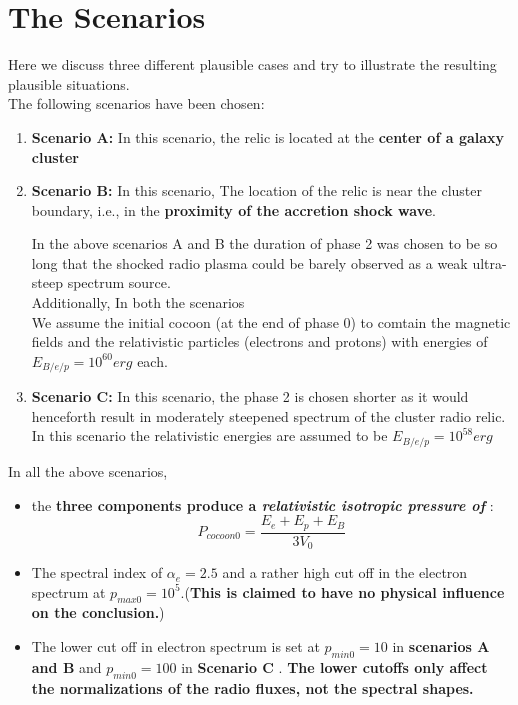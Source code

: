 \documentclass[11pt]{report}
\newcommand{\tbf}[1]{\textbf{#1}}
\newcommand{\tit}[1]{\textit{#1}}
\newcommand{\cbox}{tcolorbox}
\begin{document}
\section{The Scenarios}
Here we discuss three different plausible cases and try to illustrate the resulting plausible situations.\\
The following scenarios have been chosen:
\begin{enumerate}
\item \tbf{Scenario A:} In this scenario, the relic is located at the \tbf{center of a galaxy cluster}
\item \tbf{Scenario B:} In this scenario, The location of the relic is near the cluster boundary, i.e., in the \tbf{proximity of the accretion shock wave}.
\begin{\cbox}
In the above scenarios A and B the duration of phase 2 was chosen to be so long that the shocked radio plasma could be barely observed as a weak ultra-steep spectrum source.\\
Additionally, In both the scenarios\\
We assume the initial cocoon (at the end of phase 0) to comtain the magnetic fields and the relativistic particles (electrons and protons)  with energies of $E_{B/e/p}=10^{60}erg$ each. 
\end{\cbox}
\item \tbf{Scenario C:} In this scenario, the phase 2 is chosen shorter as it would henceforth result in moderately steepened spectrum of the cluster radio relic. In this scenario the relativistic energies are assumed to be $E_{B/e/p}=10^{58}erg$
\end{enumerate}
In all the above scenarios,
\begin{itemize}
\item the \tbf{three components produce a \tit{relativistic isotropic pressure of }}:
\begin{equation}\label{eqisoP}
P_{cocoon0}=\frac{E_e+E_p+E_B}{3V_0}
\end{equation}
 \item The spectral index of $\alpha_e=2.5$ and a rather high cut off in the electron spectrum at $p_{max0}=10^5$.(\tbf{This is claimed to have no physical influence on the conclusion.})
 \item The lower cut off in electron spectrum is set at $p_{min0}=10$ in \tbf{scenarios A and B} and $p_{min0}=100$ in \tbf{Scenario C} .\tbf{ The lower cutoffs only affect the normalizations of the radio fluxes, not the spectral shapes. }
\end{itemize}
\end{document}
